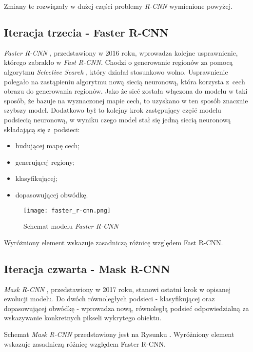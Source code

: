Zmiany te rozwiązały w dużej części problemy \textit{R-CNN} wymienione powyżej.

\subsection{Iteracja trzecia - Faster R-CNN}

\textit{Faster R-CNN} \cite{faster-rcnn}, przedstawiony w 2016 roku, wprowadza kolejne usprawnienie, którego zabrakło w \textit{Fast R-CNN}.
Chodzi o generowanie regionów za pomocą algorytmu \textit{Selective Search} \cite{selective-search}, który działał stosunkowo wolno.
Usprawnienie polegało na zastąpieniu algorytmu nową siecią neuronową, która korzysta z~cech obrazu do generowania regionów.
Jako że sieć została włączona do modelu w taki sposób, że bazuje na wyznaczonej mapie cech, to uzyskano w ten sposób znacznie szybszy model.
Dodatkowo był to kolejny krok zastępujący część modelu podsiecią neuronową, w wyniku czego model stał się jedną siecią neuronową składającą się z~podsieci:

\begin{itemize}
	\item budującej mapę cech;
	\item generującej regiony;
	\item klasyfikującej;
	\item dopasowującej obwódkę.
\end{itemize}

\begin{figure}[h]
  \centering
  \caption{Schemat modelu \textit{Faster R-CNN}}
  \texttt{[image: faster\_r-cnn.png]}
  \label{fig:faster_r_cnn}
\end{figure}

Wyróżniony element wskazuje zasadniczą różnicę względem Fast R-CNN.

\newpage
\subsection{Iteracja czwarta - Mask R-CNN}

\textit{Mask R-CNN} \cite{matterport-mask-rcnn}, przedstawiony w 2017 roku, stanowi ostatni krok w opisanej ewolucji modelu.
Do dwóch równoległych podsieci - klasyfikującej oraz dopasowującej obwódkę - wprowadza nową, równoległą podsieć odpowiedzialną za wskazywanie konkretnych pikseli wykrytego obiektu.

Schemat \textit{Mask R-CNN} przedstawiony jest na Rysunku . Wyróżniony element wskazuje zasadniczą różnicę względem Faster R-CNN.

